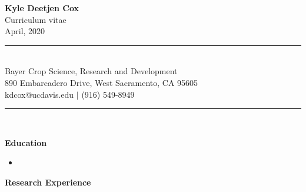 \documentclass[letterpaper,12pt]{article}
\begin{document}
\begin{center}
\fontsize{16}{19.2}
\textbf{Kyle Deetjen Cox}\\
\fontsize{12}{14.4}
Curriculum vitae\\
April, 2020\\
\noindent\rule{\linewidth}{0.4pt}\\
Bayer Crop Science, Research and Development\\
890 Embarcadero Drive, West Sacramento, CA 95605\\
kdcox@ucdavis.edu $\vert$ (916) 549-8949\\
\noindent\rule{\linewidth}{0.4pt}\\
\end{center}
\textbf{Education}
\begin{itemize}
\item[]
\end{itemize}
\vspace*{1\baselineskip}
\textbf{Research Experience}
\end{document}
